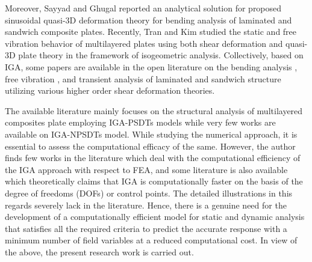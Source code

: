 \documentclass[3p,preprint,12pt]{elsarticle}
\begin{document}
Moreover, Sayyad and Ghugal \cite{sayyad2014new} reported an analytical solution for proposed sinusoidal quasi-3D deformation theory for bending analysis of laminated and sandwich composite plates. Recently, Tran and Kim \cite{tran2018static} studied the static and free vibration behavior of multilayered plates using both shear deformation and quasi-3D plate theory in the framework of isogeometric analysis. Collectively, based on IGA, some papers are available in the open literature on the bending analysis \cite{nguyen2013isogeometric, natarajan2014analysis, li2014static, thai2015isogeometric, pavan2017bending, liu2017isogeometric, DUFOUR201812}, free vibration \cite{cottrell2006isogeometric, shojaee2012free, wang2013novel, pekovic2015free, thai2014isogeometric, FANTUZZI2016173, shi2018new, kiani2018isogeometric, FAROUGHI201989}, and transient \cite{kapoor2012geometrically, tran2015geometrically, phung2017isogeometric, gupta2017transient} analysis of laminated and sandwich structure utilizing various higher order shear deformation theories. 



The available literature mainly focuses on the structural analysis of multilayered composites plate employing IGA-PSDTs models while very few works are available on IGA-NPSDTs model. While studying the numerical approach, it is essential to assess the computational efficacy of the same. However, the author finds few works in the literature which deal with the computational efficiency of the IGA approach \cite{morgantis2014ices} with respect to FEA, and some literature is also available which theoretically claims that IGA is computationally faster on the basis of the degree of freedoms (DOFs) or control points. The detailed illustrations in this regards severely lack in the literature. Hence, there is a genuine need for the development of a computationally efficient model for static and dynamic analysis that satisfies all the required criteria to predict the accurate response with a minimum number of field variables at a reduced computational cost. In view of the above, the present research work is carried out.
\end{document}
